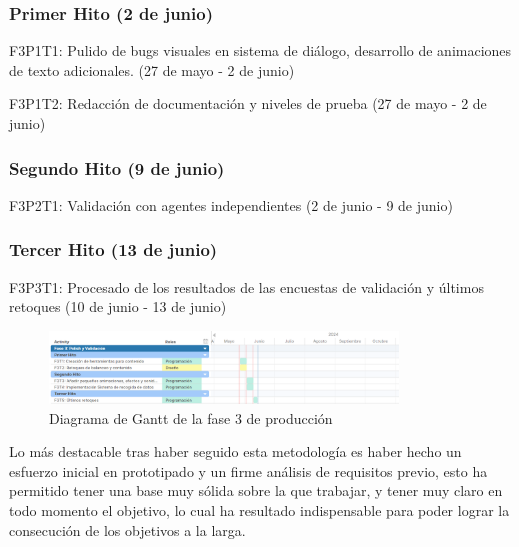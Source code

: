 \subsubsection{Primer Hito (2 de junio)}

\begin{compactitem}
\item F3P1T1: Pulido de bugs visuales en sistema de diálogo, desarrollo de animaciones de texto adicionales. (27 de mayo - 2 de junio)
\item F3P1T2: Redacción de documentación y niveles de prueba (27 de mayo - 2 de junio)
\end{compactitem}

\subsubsection{Segundo Hito (9 de junio)}

\begin{compactitem}
\item F3P2T1: Validación con agentes independientes (2 de junio - 9 de junio)
\end{compactitem}

\subsubsection{Tercer Hito (13 de junio)}

\begin{compactitem}
  \item F3P3T1: Procesado de los resultados de las encuestas de validación y últimos retoques (10 de junio - 13 de junio)
\end{compactitem}

\begin{figure}[H]
  \centering
	\includegraphics[width=350px,clip=true]{gantt3.png}
  \caption{Diagrama de Gantt de la fase 3 de producción}
  \label{fig:fase3gantt}
\end{figure}

Lo más destacable tras haber seguido esta metodología es haber hecho un esfuerzo inicial en prototipado y un firme análisis de requisitos 
previo, esto ha permitido tener una base muy sólida sobre la que trabajar, y tener muy claro en todo momento el objetivo, lo cual ha resultado indispensable 
para poder lograr la consecución de los objetivos a la larga.